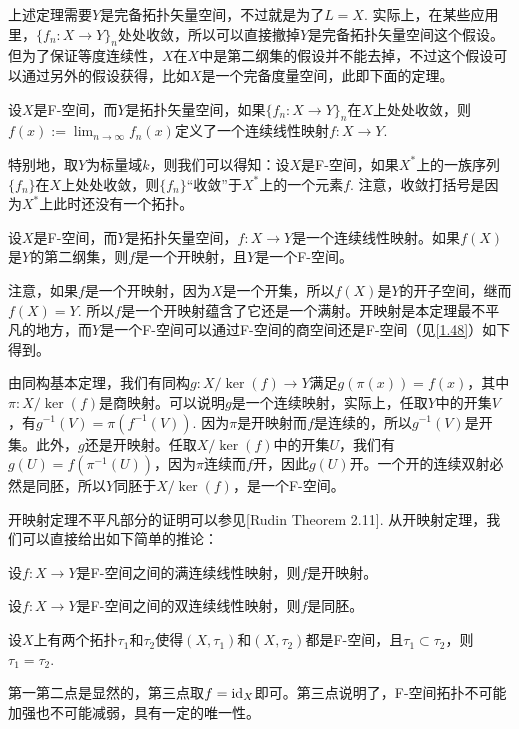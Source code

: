 上述定理需要$Y$是完备拓扑矢量空间，不过就是为了$L=X$. 实际上，在某些应用里，$\{f_n:X\to Y\}_n$处处收敛，所以可以直接撤掉$Y$是完备拓扑矢量空间这个假设。但为了保证等度连续性，$X$在$X$中是第二纲集的假设并不能去掉，不过这个假设可以通过另外的假设获得，比如$X$是一个完备度量空间，此即下面的定理。

\begin{thm}
设$X$是F-空间，而$Y$是拓扑矢量空间，如果$\{f_n:X\to Y\}_n$在$X$上处处收敛，则$f(x):=\lim_{n\to \infty}f_n(x)$定义了一个连续线性映射$f:X\to Y$.
\end{thm}

特别地，取$Y$为标量域$k$，则我们可以得知：设$X$是F-空间，如果$X^*$上的一族序列$\{f_n\}$在$X$上处处收敛，则$\{f_n\}$“收敛”于$X^*$上的一个元素$f$. 注意，收敛打括号是因为$X^*$上此时还没有一个拓扑。

\begin{thm}[开映射定理]
设$X$是F-空间，而$Y$是拓扑矢量空间，$f:X\to Y$是一个连续线性映射。如果$f(X)$是$Y$的第二纲集，则$f$是一个开映射，且$Y$是一个F-空间。
\end{thm}

注意，如果$f$是一个开映射，因为$X$是一个开集，所以$f(X)$是$Y$的开子空间，继而$f(X)=Y$. 所以$f$是一个开映射蕴含了它还是一个满射。开映射是本定理最不平凡的地方，而$Y$是一个F-空间可以通过F-空间的商空间还是F-空间（见\ref{1.48}）如下得到。

由同构基本定理，我们有同构$g:X/\ker(f)\to Y$满足$g(\pi(x))=f(x)$，其中$\pi:X/\ker(f)$是商映射。可以说明$g$是一个连续映射，实际上，任取$Y$中的开集$V$，有$g^{-1}(V)=\pi(f^{-1}(V))$. 因为$\pi$是开映射而$f$是连续的，所以$g^{-1}(V)$是开集。此外，$g$还是开映射。任取$X/\ker(f)$中的开集$U$，我们有$g(U)=f(\pi^{-1}(U))$，因为$\pi$连续而$f$开，因此$g(U)$开。一个开的连续双射必然是同胚，所以$Y$同胚于$X/\ker(f)$，是一个F-空间。

开映射定理不平凡部分的证明可以参见[Rudin Theorem 2.11]. 从开映射定理，我们可以直接给出如下简单的推论：
\begin{compactenum}
\item 设$f:X\to Y$是F-空间之间的满连续线性映射，则$f$是开映射。
\item 设$f:X\to Y$是F-空间之间的双连续线性映射，则$f$是同胚。
\item 设$X$上有两个拓扑$\tau_1$和$\tau_2$使得$(X,\tau_1)$和$(X,\tau_2)$都是F-空间，且$\tau_1\subset \tau_2$，则$\tau_1=\tau_2$.
\end{compactenum}

第一第二点是显然的，第三点取$f=\operatorname{id}_X$即可。第三点说明了，F-空间拓扑不可能加强也不可能减弱，具有一定的唯一性。

